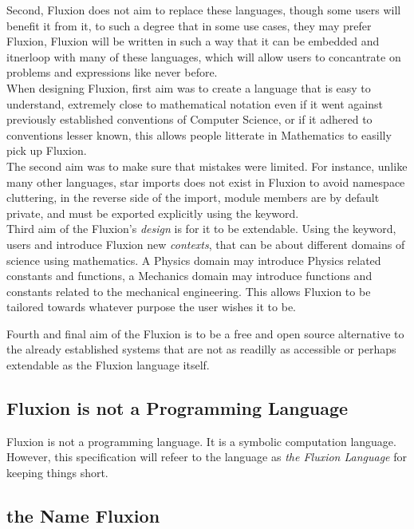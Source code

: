 \documentclass[11pt,a4paper]{book}
\begin{document}
Second, Fluxion does not aim to replace these languages, though some users will benefit it from it, to such a degree that in some use cases, they may prefer Fluxion, Fluxion will be written in such a way that it can be embedded and itnerloop with many of these languages, which will allow users to concantrate on problems and expressions like never before.\\

When designing Fluxion, first aim was to create a language that is easy to understand, extremely close to mathematical notation even if it went against previously established conventions of Computer Science, or if it adhered to conventions lesser known, this allows people litterate in Mathematics to easilly pick up Fluxion.\\

The second aim was to make sure that mistakes were limited. For instance, unlike many other languages, star imports does not exist in Fluxion to avoid namespace cluttering, in the reverse side of the import, module members are by default private, and must be exported explicitly using the  keyword.\\

Third aim of the Fluxion's \textit{design} is for it to be extendable. Using the  keyword, users and introduce Fluxion new \textit{contexts}, that can be about different domains of science using mathematics. A Physics domain may introduce Physics related constants and functions, a Mechanics domain may introduce functions and constants related to the mechanical engineering. This allows Fluxion to be tailored towards whatever purpose the user wishes it to be.

Fourth and final aim of the Fluxion is to be a free and open source alternative to the already established systems that are not as readilly as accessible or perhaps extendable as the Fluxion language itself.

\subsection{Fluxion is not a Programming Language}

Fluxion is not a programming language. It is a symbolic computation language. However, this specification will refeer to the language as \textit{the Fluxion Language} for keeping things short.

\subsection{the Name Fluxion}
\end{document}
